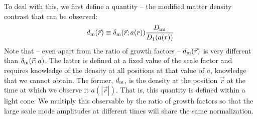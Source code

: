 \documentclass[prd,amsmath,amssymb,floatfix,superscriptaddress,nofootinbib,twocolumn]{revtex4-1}
\def\be{\begin{equation}}
\def\ee{\end{equation}}
\newcommand{\ini}{\rm ini}
\newcommand{\vrr}{\vec{r}}
\newcommand{\eql}[1]{\label{eq:#1}}
\begin{document}
\newcommand\dm{\delta_{\rm m}}
\newcommand\dlc{d_{\rm m}}
\newcommand\dmi{\delta_{\rm m,ini}}
\newcommand\dlch{d^{\rm h}_{\rm m}}
\newcommand\dolc{d^{ (1)}_{\rm m}}
\newcommand\dtlc{d^{ (2)}_{\rm m}}
To deal with this, we first define a quantity -- the modified matter density contrast that can be observed: 
\be
\dlc(\vrr) \equiv \dm(\vrr;a(r)) \frac{D_{\ini}}{D_{1}(a(r))} \eql{LC}
\ee
Note that -- even apart from the ratio of growth factors -- $\dlc(\vrr)$ is very different than $\dm(\vrr; a)$. The latter is defined at a fixed value of the scale factor and requires knowledge of the density at all positions at that value of $a$, knowledge that we cannot obtain. The former, $\dlc$, is the density at the position $\vrr$ at the time at which we observe it $a(|\vrr|)$. That is, this quantity is defined within a light cone.
%
We multiply this observable by the ratio of growth factors so that the large scale mode amplitudes at different times will share the same normalization. 
\end{document}
